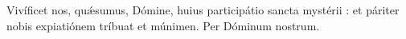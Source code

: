 Vivíficet nos, quǽsumus, Dómine, huius participátio sancta mystérii : et páriter nobis expiatiónem tríbuat et múnimen. Per Dóminum nostrum.
